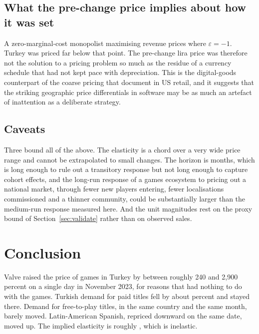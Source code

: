\documentclass[11pt]{article}
\begin{document}
\subsection{What the pre-change price implies about how it was set}

A zero-marginal-cost monopolist maximising revenue prices where $\varepsilon = -1$. Turkey was
priced far below that point. The pre-change lira price was therefore not the solution to a pricing
problem so much as the residue of a currency schedule that had not kept pace with depreciation.
This is the digital-goods counterpart of the coarse pricing that \citet{dellavigna2019} document in
US retail, and it suggests that the striking geographic price differentials in software may be as
much an artefact of inattention as a deliberate strategy.

\subsection{Caveats}

Three bound all of the above. The elasticity is a chord over a very wide price range and cannot be
extrapolated to small changes. The horizon is \horizonMonths{} months, which is long enough to rule out a transitory response but not
long enough to capture cohort effects, and the long-run response of a games
ecosystem to pricing out a national market, through fewer new players entering, fewer localisations
commissioned and a thinner community, could be substantially larger than the medium-run response
measured here. And the unit magnitudes rest on the proxy bound of Section~\ref{sec:validate} rather
than on observed sales.

\section{Conclusion}\label{sec:conclusion}

Valve raised the price of games in Turkey by between roughly 240 and 2{,}900 percent on a single day
in November 2023, for reasons that had nothing to do with the games. Turkish demand for paid titles
fell by about \pctDDD{} percent and stayed there. Demand for free-to-play titles, in the same
country and the same month, barely moved. Latin-American Spanish, repriced downward on the same
date, moved up. The implied elasticity is roughly \bDose, which is inelastic.
\end{document}
